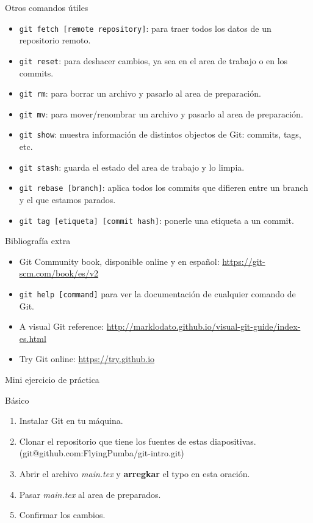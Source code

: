 \documentclass{beamer}
\begin{document}
\begin{frame}{Otros comandos útiles}

    \begin{itemize}
        \item \texttt{git fetch [remote repository]}: para traer todos los datos de un repositorio remoto.
        \item \texttt{git reset}: para deshacer cambios, ya sea en el area de trabajo o en los commits.
        \item \texttt{git rm}: para borrar un archivo y pasarlo al area de preparación.
        \item \texttt{git mv}: para mover/renombrar un archivo y pasarlo al area de preparación.
        \item \texttt{git show}: muestra información de distintos objectos de Git: commits, tags, etc.
        \item \texttt{git stash}: guarda el estado del area de trabajo y lo limpia.
        \item \texttt{git rebase [branch]}: aplica todos los commits que difieren entre un branch y el que estamos parados.
        \item \texttt{git tag [etiqueta] [commit hash]}: ponerle una etiqueta a un commit.
    \end{itemize}

\end{frame}

\begin{frame}{Bibliografía extra}

    \begin{itemize}
        \item Git Community book, disponible online y en español: \url{https://git-scm.com/book/es/v2}
		\item \texttt{git help [command]} para ver la documentación de cualquier comando de Git.
		\item A visual Git reference: \url{http://marklodato.github.io/visual-git-guide/index-es.html}
		\item Try Git online: \url{https://try.github.io}
    \end{itemize}

\end{frame}

\begin{frame}{Mini ejercicio de práctica}

	\begin{block}{Básico}
		\begin{enumerate}
			\item Instalar Git en tu máquina.
			\item Clonar el repositorio que tiene los fuentes de estas diapositivas. (git@github.com:FlyingPumba/git-intro.git)
			\item Abrir el archivo \textit{main.tex} y \textbf{arregkar} el typo en esta oración.
			\item Pasar \textit{main.tex} al area de preparados.
			\item Confirmar los cambios.
		\end{enumerate}
	\end{block}

\end{frame}
\end{document}
